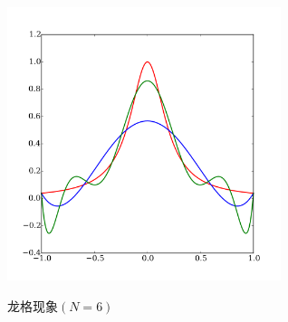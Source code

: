 \begin{figure}[htbp]
   \caption{龙格现象$(N=6)$}
  \centering
  \includegraphics[width=8cm]{./Figures/20180227-Runge-phenomenon.png}
  \label{fig:ninc-nc-higher-runge-phenomenon}
%
\end{figure}

